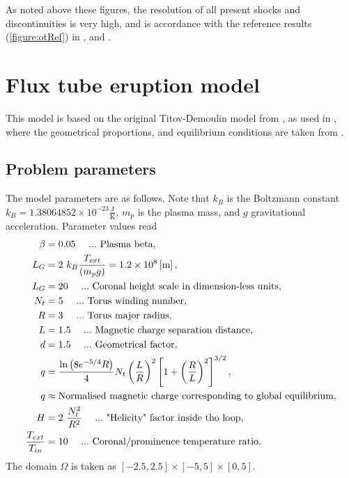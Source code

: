 As noted above these figures, the resolution of all present shocks and discontinuities is very high, and is accordance with the reference results (\cref{figure:otRef}) in \cite{blast1}, and \cite{blast0}.

\section{Flux tube eruption model}
This model is based on the original Titov-Demoulin model from \cite{td}, as used in \cite{miraClanek}, where the geometrical proportions, and equilibrium conditions are taken from \cite{td}.
\subsection{Problem parameters}
The model parameters are as follows. Note that $k_B$ is the Boltzmann constant $k_B = 1.38064852 \times 10^{-23} \frac{\mathrm{J}}{\mathrm{K}}$, $m_p$ is the plasma mass, and $g$ gravitational acceleration. Parameter values read
\begin{align}
\nonumber \beta & =  0.05\ \ \ \ ...\ \text{Plasma beta},\\
\nonumber L_G & =  2\ k_B \frac{T_{ext}}{\lo m_p g \ro} = 1.2 \times 10^8 \left[\text{m}\right],\\
\nonumber L_G & =  20 \ \ \ \ ...\ \text{Coronal height scale in dimension-less units},\\
\nonumber N_t & = 5\ \ \ \ ...\ \text{Torus winding number},\\
\nonumber R & = 3\ \ \ \ ...\ \text{Torus major radius},\\
\nonumber L & = 1.5\ \ \ \ ...\ \text{Magnetic charge separation distance},\\
\nonumber d & =  1.5\ \ \ \ ...\ \text{Geometrical factor},\\
\nonumber q & =  \frac{\ln\lo 8 e^{-5/4} R\ro}{4} N_t \lo\frac{L}{R}\ro^2\left[1 + \lo\frac{R}{L}\ro^2\right]^{3/2},\\
\nonumber q & \approx \text{Normalised magnetic charge corresponding to global equilibrium},\\
\nonumber H & = 2\ \frac{N_t^2}{R^2}\ \ \ \ ...\ \text{"Helicity" factor inside tho loop},\\
\nonumber \frac{ T_{ext} }{T_{in}} & =  10\ \ \ \ ...\ \text{Coronal/prominence temperature ratio}.\\
\end{align}
The domain $\Omega$ is taken as $\left[-2.5, 2.5\right] \times \left[-5, 5\right] \times \left[0, 5\right]$.
